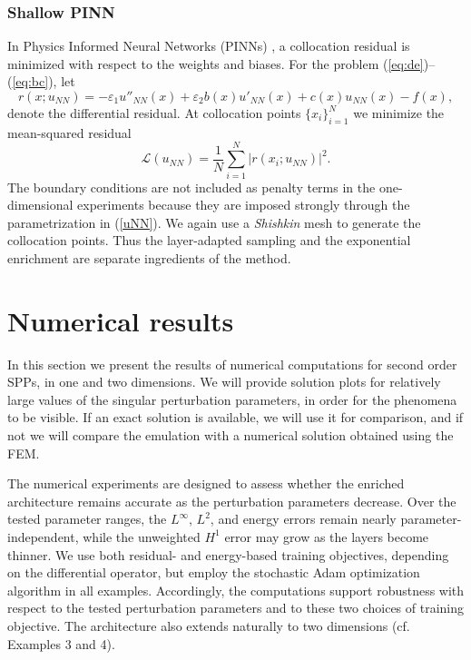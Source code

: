 \documentclass[11pt]{article}
\providecommand{\e}{\varepsilon}
\theoremstyle{plain}
\theoremstyle{definition}
\theoremstyle{remark}
\numberwithin{equation}{section}
\begin{document}
%
\subsubsection{Shallow PINN}
\label{shallowpinn}
In Physics Informed Neural Networks (PINNs) \cite{LLF, RPK}, a collocation residual is minimized with respect to the weights and biases. For the problem (\ref{eq:de})--(\ref{eq:bc}), let
\[
r(x;u_{NN})=- \e_1 u''_{NN}(x) + \e_2 b(x) u'_{NN}(x) + c(x)u_{NN}(x)-f(x),
\]
denote the differential residual. At collocation points $\{x_i\}_{i=1}^N$ we minimize the mean-squared residual
\begin{equation}\label{PINNloss}
\mathcal{L}(u_{NN}) = \frac{1}{N}\sum_{i=1}^N \left|r(x_i;u_{NN})\right|^2.
\end{equation}
The boundary conditions are not included as penalty terms in the one-dimensional experiments because they are imposed strongly through the parametrization in (\ref{uNN}). We again use a \emph{Shishkin} mesh \cite{Shishkin2} to generate the collocation points. Thus the layer-adapted sampling and the exponential enrichment are separate ingredients of the method.


\section{Numerical results}
\label{sec:nr}
In this section we present the results of numerical computations for second order SPPs, in one and two dimensions. 
We will provide solution plots for relatively large values of the singular perturbation parameters, in order for the phenomena to be visible.  If an exact solution is available, we will use it for comparison, and if not we will compare the emulation with a numerical solution obtained using the FEM.

The numerical experiments are designed to assess whether the enriched architecture remains accurate as the perturbation parameters decrease. Over the tested parameter ranges, the $L^\infty$, $L^2$, and energy errors remain nearly parameter-independent, while the unweighted $H^1$ error may grow as the layers become thinner. We use both residual- and energy-based training objectives, depending on the differential operator, but employ the stochastic Adam optimization algorithm \cite{adam} in all examples. Accordingly, the computations support robustness with respect to the tested perturbation parameters and to these two choices of training objective. The architecture also extends naturally to two dimensions (cf. Examples 3 and 4).
\end{document}
